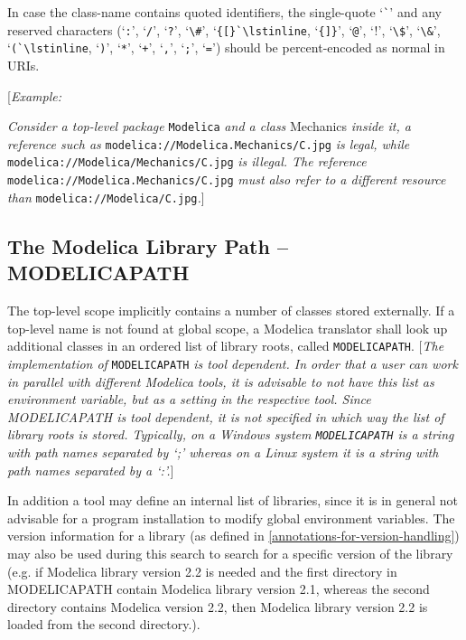 In case the class-name contains quoted identifiers, the single-quote `\lstinline!`!'
and any reserved characters (`\lstinline!:!', `\lstinline!/!', `\lstinline!?!', `\lstinline!\#!', `\lstinline!{[}`\lstinline!,
`\lstinline!{]}!', `\lstinline!@!', `\lstinline!!!', `\lstinline!\$!', `\lstinline!\&!', `\lstinline!(`\lstinline!, `\lstinline!)!', `\lstinline!*!', `\lstinline!+!',
`\lstinline!,!', `\lstinline!;!', `\lstinline!=!') should be percent-encoded as normal in URIs.

{[}\emph{Example:}

\emph{Consider a top-level package} \lstinline!Modelica! \emph{and a class}
Mechanics \emph{inside it, a reference such as}
\lstinline!modelica://Modelica.Mechanics/C.jpg! \emph{is legal, while}
\lstinline!modelica://Modelica/Mechanics/C.jpg! \emph{is illegal. The reference}
\lstinline!modelica://Modelica.Mechanics/C.jpg! \emph{must also refer to a different
resource than} \lstinline!modelica://Modelica/C.jpg!\emph{.}{]}

\subsection{The Modelica Library Path -- MODELICAPATH}

The top-level scope implicitly contains a number of classes stored
externally. If a top-level name is not found at global scope, a Modelica
translator shall look up additional classes in an ordered list of
library roots, called \lstinline!MODELICAPATH!. {[}\emph{The implementation of}
\lstinline!MODELICAPATH! \emph{is tool dependent. In order that a user can work in
parallel with different Modelica tools, it is advisable to not have this
list as environment variable, but as a setting in the respective tool.
Since MODELICAPATH is tool dependent, it is not specified in which way
the list of library roots is stored. Typically, on a Windows system
\lstinline!MODELICAPATH! is a string with path names separated by `;' whereas on a
Linux system it is a string with path names separated by a `:'.}{]}

In addition a tool may define an internal list of libraries, since it is
in general not advisable for a program installation to modify global
environment variables. The version information for a library (as defined
in \autoref{annotations-for-version-handling}) may also be used during this search to search for a
specific version of the library (e.g. if Modelica library version 2.2 is
needed and the first directory in MODELICAPATH contain Modelica library
version 2.1, whereas the second directory contains Modelica version 2.2,
then Modelica library version 2.2 is loaded from the second directory.).

